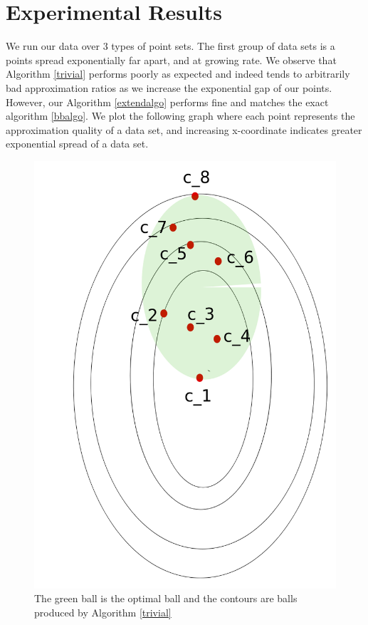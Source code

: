 \documentclass[11pt]{myclass}
\begin{document}
\section{Experimental Results}
We run our data over $3$ types of point sets. The first group of data sets is a points spread exponentially far apart, and at growing rate. We observe that Algorithm \ref{trivial} performs poorly as expected and indeed tends to arbitrarily bad approximation ratios as we increase the exponential gap of our points. However, our Algorithm \ref{extendalgo} performs fine and matches the exact algorithm \ref{bbalgo}. We plot the following graph where each point represents the approximation quality of a data set, and increasing x-coordinate indicates greater exponential spread of a data set.

\begin{figure}[H]
  \begin{center}
    \includegraphics[scale = 0.2]{../figures/trivial_fail}
  \end{center}
  \caption{The green ball is the optimal ball and the contours are balls produced by Algorithm \ref{trivial}}
\end{figure}
\end{document}
